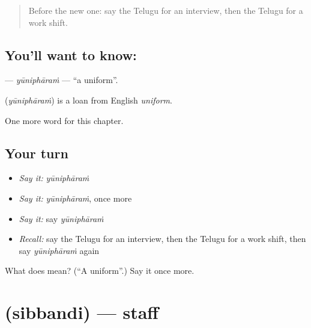 \label{lesson:TE-C198-yunipharam}



\begin{quote}
Before the new one: say the Telugu for an interview, then the Telugu for a work shift.
\end{quote}

\subsection*{You'll want to know: }
\textbf{} — \emph{yūniphāraṁ} — \textquotedblleft{}a uniform\textquotedblright{}.

\begin{cousinweb}
\textbf{} (\emph{yūniphāraṁ}) is a loan from English \emph{uniform}.
\end{cousinweb}

\begin{grammarlens}[title={What you've built}]
One more word for this chapter.
\end{grammarlens}

\subsection*{Your turn}
\begin{itemize}
\raggedright
  \item \emph{Say it:} \emph{yūniphāraṁ}
  \item \emph{Say it:} \emph{yūniphāraṁ}, once more
  \item \emph{Say it:} say \emph{yūniphāraṁ}
  \item \emph{Recall:} say the Telugu for an interview, then the Telugu for a work shift, then say \emph{yūniphāraṁ} again
\end{itemize}

\begin{tcolorbox}[breakable,colback=teal!4,colframe=teal!35!black,title={Before you move on}]
What does  mean? (\textquotedblleft{}A uniform\textquotedblright{}.) Say it once more.
\end{tcolorbox}
\section[\texorpdfstring{\te{సిబ్బంది} (sibbandi)}{సిబ్బంది (sibbandi)}]{ (sibbandi) — staff}

\label{lesson:TE-C198-sibbandi}



